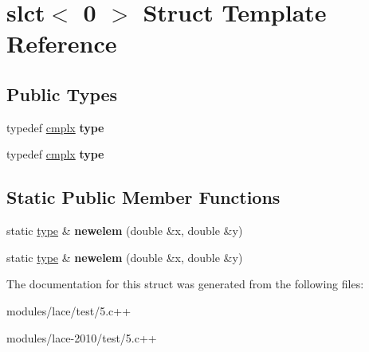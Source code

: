 \hypertarget{structslct_3_010_01_4}{\section{slct$<$ 0 $>$ Struct Template Reference}
\label{structslct_3_010_01_4}
}
\subsection*{Public Types}
\begin{DoxyCompactItemize}
\item 
\hypertarget{structslct_3_010_01_4_a35737ff80364a93086bdc21c641d4998}{typedef \hyperlink{structcmplx}{cmplx} {\bfseries type}}\label{structslct_3_010_01_4_a35737ff80364a93086bdc21c641d4998}

\item 
\hypertarget{structslct_3_010_01_4_a35737ff80364a93086bdc21c641d4998}{typedef \hyperlink{structcmplx}{cmplx} {\bfseries type}}\label{structslct_3_010_01_4_a35737ff80364a93086bdc21c641d4998}

\end{DoxyCompactItemize}
\subsection*{Static Public Member Functions}
\begin{DoxyCompactItemize}
\item 
\hypertarget{structslct_3_010_01_4_ab7710ee45e90ef1b65b5d8859335fe8f}{static \hyperlink{structcmplx}{type} \& {\bfseries newelem} (double \&x, double \&y)}\label{structslct_3_010_01_4_ab7710ee45e90ef1b65b5d8859335fe8f}

\item 
\hypertarget{structslct_3_010_01_4_ab7710ee45e90ef1b65b5d8859335fe8f}{static \hyperlink{structcmplx}{type} \& {\bfseries newelem} (double \&x, double \&y)}\label{structslct_3_010_01_4_ab7710ee45e90ef1b65b5d8859335fe8f}

\end{DoxyCompactItemize}


The documentation for this struct was generated from the following files\-:\begin{DoxyCompactItemize}
\item 
modules/lace/test/5.\-c++\item 
modules/lace-\/2010/test/5.\-c++\end{DoxyCompactItemize}
